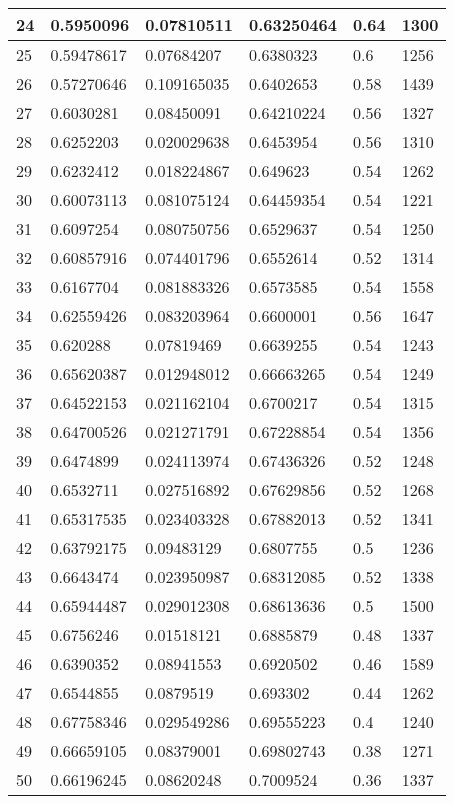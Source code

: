 \begin{longtable}{|l|l|l|l|l|l|}
24 & 0.5950096 & 0.07810511 & 0.63250464 & 0.64 & 1300 \\ \hline 
25 & 0.59478617 & 0.07684207 & 0.6380323 & 0.6 & 1256 \\ \hline 
26 & 0.57270646 & 0.109165035 & 0.6402653 & 0.58 & 1439 \\ \hline 
27 & 0.6030281 & 0.08450091 & 0.64210224 & 0.56 & 1327 \\ \hline 
28 & 0.6252203 & 0.020029638 & 0.6453954 & 0.56 & 1310 \\ \hline 
29 & 0.6232412 & 0.018224867 & 0.649623 & 0.54 & 1262 \\ \hline 
30 & 0.60073113 & 0.081075124 & 0.64459354 & 0.54 & 1221 \\ \hline 
31 & 0.6097254 & 0.080750756 & 0.6529637 & 0.54 & 1250 \\ \hline 
32 & 0.60857916 & 0.074401796 & 0.6552614 & 0.52 & 1314 \\ \hline 
33 & 0.6167704 & 0.081883326 & 0.6573585 & 0.54 & 1558 \\ \hline 
34 & 0.62559426 & 0.083203964 & 0.6600001 & 0.56 & 1647 \\ \hline 
35 & 0.620288 & 0.07819469 & 0.6639255 & 0.54 & 1243 \\ \hline 
36 & 0.65620387 & 0.012948012 & 0.66663265 & 0.54 & 1249 \\ \hline 
37 & 0.64522153 & 0.021162104 & 0.6700217 & 0.54 & 1315 \\ \hline 
38 & 0.64700526 & 0.021271791 & 0.67228854 & 0.54 & 1356 \\ \hline 
39 & 0.6474899 & 0.024113974 & 0.67436326 & 0.52 & 1248 \\ \hline 
40 & 0.6532711 & 0.027516892 & 0.67629856 & 0.52 & 1268 \\ \hline 
41 & 0.65317535 & 0.023403328 & 0.67882013 & 0.52 & 1341 \\ \hline 
42 & 0.63792175 & 0.09483129 & 0.6807755 & 0.5 & 1236 \\ \hline 
43 & 0.6643474 & 0.023950987 & 0.68312085 & 0.52 & 1338 \\ \hline 
44 & 0.65944487 & 0.029012308 & 0.68613636 & 0.5 & 1500 \\ \hline 
45 & 0.6756246 & 0.01518121 & 0.6885879 & 0.48 & 1337 \\ \hline 
46 & 0.6390352 & 0.08941553 & 0.6920502 & 0.46 & 1589 \\ \hline 
47 & 0.6544855 & 0.0879519 & 0.693302 & 0.44 & 1262 \\ \hline 
48 & 0.67758346 & 0.029549286 & 0.69555223 & 0.4 & 1240 \\ \hline 
49 & 0.66659105 & 0.08379001 & 0.69802743 & 0.38 & 1271 \\ \hline 
50 & 0.66196245 & 0.08620248 & 0.7009524 & 0.36 & 1337 \\ \hline 
\end{longtable}